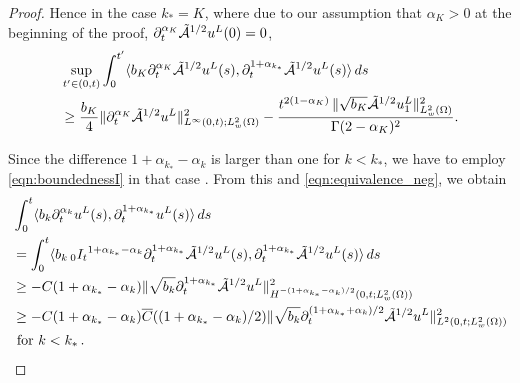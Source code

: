 \begin{proof}
Hence in the case $k_*=K$, where due to our assumption that $\alpha_K>0$ at the beginning of the proof, $\partial_t^{\alpha_K} \tilde{\mathcal{A}}^{1/2}u^L(0)=0$,
\[
\begin{aligned}
&\sup_{t'\in(0,t)}\int_0^{t'}\langle b_K \partial_t^{\alpha_K} \tilde{\mathcal{A}}^{1/2}u^L(s), \partial_t^{1+\alpha_{k_*}}\tilde{\mathcal{A}}^{1/2}u^L(s)\rangle\, ds\\
&\geq \frac{b_K}{4}\|\partial_t^{\alpha_K}\tilde{\mathcal{A}}^{1/2}u^L\|_{L^\infty(0,t);L^2_w(\Omega)}^2
-\frac{t^{2(1-\alpha_{K})}\,\|\sqrt{b_{K}}\tilde{\mathcal{A}}^{1/2}u_1^L\|_{L^2_w(\Omega)}^2}{\Gamma(2-\alpha_{K})^2}.
\end{aligned} 
\]

Since the difference $1+\alpha_{k_*}-\alpha_k$ is larger than one for $k< k_*$, 
we have to employ \eqref{eqn:boundednessI} in that case .
From this and \eqref{eqn:equivalence_neg}, 
we obtain
\begin{equation}\label{eqn:estbmlower}
\begin{aligned}
&\int_0^t\langle b_k \partial_t^{\alpha_k} u^L(s), \partial_t^{1+\alpha_{k_*}}u^L(s)\rangle\, ds\\
&= \int_0^t\langle b_k \, {_0I_t}^{1+\alpha_{k_*}-\alpha_k}\partial_t^{1+\alpha_{k_*}} \tilde{\mathcal{A}}^{1/2}u^L(s), \partial_t^{1+\alpha_{k_*}}\tilde{\mathcal{A}}^{1/2}u^L(s) \rangle\, ds\\
&\geq -C(1+\alpha_{k_*}-\alpha_k) \|\sqrt{b_k}\partial_t^{1+\alpha_{k_*}} \tilde{\mathcal{A}}^{1/2}u^L\|_{H^{-(1+\alpha_{k_*}-\alpha_k)/2}(0,t;L^2_w(\Omega))}^2\\
&\geq -C(1+\alpha_{k_*}-\alpha_k)\overline{C}((1+\alpha_{k_*}-\alpha_k)/2)\|\sqrt{b_k}\partial_t^{(1+\alpha_{k_*}+\alpha_k)/2}\tilde{\mathcal{A}}^{1/2}u^L\|_{L^2(0,t;L^2_w(\Omega))}^2\\
&\mbox{ for }k<{k_*}\,.
\end{aligned} 
\end{equation}



\end{proof}

